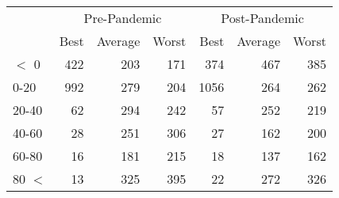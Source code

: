 
\begin{tabular}[t]{lrrrrrr}
\toprule
\multicolumn{1}{c}{ } & \multicolumn{3}{c}{Pre-Pandemic} & \multicolumn{3}{c}{Post-Pandemic} \\
\cmidrule(l{3pt}r{3pt}){2-4} \cmidrule(l{3pt}r{3pt}){5-7}
 & Best & Average & Worst & Best & Average & Worst\\
\midrule
$<$ 0 & 422 & 203 & 171 & 374 & 467 & 385\\
0-20 & 992 & 279 & 204 & 1056 & 264 & 262\\
20-40 & 62 & 294 & 242 & 57 & 252 & 219\\
40-60 & 28 & 251 & 306 & 27 & 162 & 200\\
60-80 & 16 & 181 & 215 & 18 & 137 & 162\\
80 $<$ & 13 & 325 & 395 & 22 & 272 & 326\\
\bottomrule
\end{tabular}
